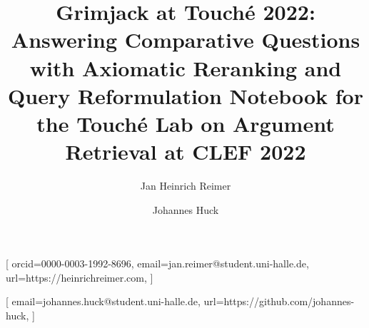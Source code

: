 \documentclass{ceurart}
\begin{document}

\title{%
  Grimjack at Touché 2022:\\
  Answering Comparative Questions with Axiomatic Reranking and Query Reformulation%
}
\title[mode=sub]{%
  Notebook for the Touché Lab on Argument Retrieval at CLEF 2022%
}

\author[1]{Jan Heinrich Reimer}[
  orcid=0000-0003-1992-8696,
  email=jan.reimer@student.uni-halle.de,
  url=https://heinrichreimer.com,
]
\author[1]{Johannes Huck}[
  email=johannes.huck@student.uni-halle.de,
  url=https://github.com/johannes-huck,
]

\address[1]{%
  Martin-Luther-Universität Halle-Wittenberg,
  06099~Halle~(Saale), Germany
}



\maketitle








\end{document}
